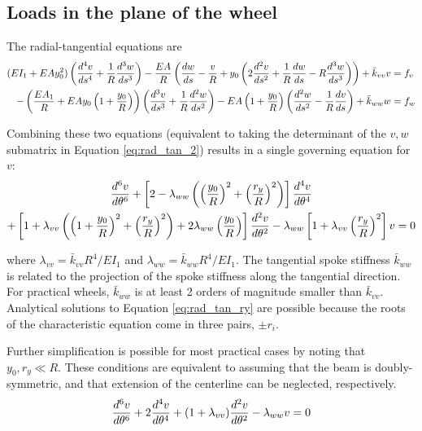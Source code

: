 \documentclass[\rootdir/thesis.tex]{subfiles}
\begin{document}
\subsection{Loads in the plane of the wheel}

The radial-tangential equations are
\begin{subequations}
\begin{align}
\label{eq:rad_tan_2}
(EI_1 + EAy_0^2)\left( \frac{d^4v}{ds^4} + \frac{1}{R}\frac{d^3w}{ds^3} \right) -
    \frac{EA}{R}\left( \frac{dw}{ds} - \frac{v}{R} +y_0\left(2\frac{d^2v}{ds^2} + \frac{1}{R}\frac{dw}{ds} -
    R\frac{d^3w}{ds^3}\right) \right) +\bar{k}_{vv}v &= f_v\\
-\left( \frac{EA_1}{R} + EAy_0\left( 1 + \frac{y_0}{R} \right) \right)
    \left(\frac{d^3v}{ds^3} + \frac{1}{R}\frac{d^2w}{ds^2} \right) -
    EA\left(1+\frac{y_0}{R} \right) \left(\frac{d^2w}{ds^2} - \frac{1}{R}\frac{dv}{ds} \right) + \bar{k}_{ww}w &= f_w
\end{align}
\end{subequations}

Combining these two equations (equivalent to taking the determinant of the $v,w$ submatrix in Equation \eqref{eq:rad_tan_2}) results in a single governing equation for $v$:
\begin{multline}
\label{eq:rad_tan_ry}
\frac{d^6v}{d\theta^6} + \left[2-\lambda_{ww}\left(\left(\frac{y_0}{R}\right)^2 +
                                        \left(\frac{r_y}{R}\right)^2 \right) \right] \frac{d^4v}{d\theta^4}\\
          + \left[1+\lambda_{vv}\left(\left(1+\frac{y_0}{R}\right)^2+\left(\frac{r_y}{R}\right)^2\right)
                   +2\lambda_{ww}\left(\frac{y_0}{R}\right)\right]\frac{d^2v}{d\theta^2}
          - \lambda_{ww}\left[1+\lambda_{vv}\left(\frac{r_y}{R}\right)^2\right] v = 0
\end{multline}

where $\lambda_{vv}=\bar{k}_{vv}R^4/EI_1$ and $\lambda_{ww}=\bar{k}_{ww}R^4/EI_1$. The tangential spoke stiffness $\bar{k}_{ww}$ is related to the projection of the spoke stiffness along the tangential direction. For practical wheels, $\bar{k}_{ww}$ is at least 2 orders of magnitude smaller than $\bar{k}_{vv}$. Analytical solutions to Equation \eqref{eq:rad_tan_ry} are possible because the roots of the characteristic equation come in three pairs, $\pm r_i$.

Further simplification is possible for most practical cases by noting that $y_0,r_y \ll R$. These conditions are equivalent to assuming that the beam is doubly-symmetric, and that extension of the centerline can be neglected, respectively.
\begin{equation}
\label{eq:rad_tan}
\frac{d^6v}{d\theta^6} + 2\frac{d^4v}{d\theta^4}+(1+\lambda_{vv})\frac{d^2v}{d\theta^2} - \lambda_{ww}v=0
\end{equation}
\end{document}
